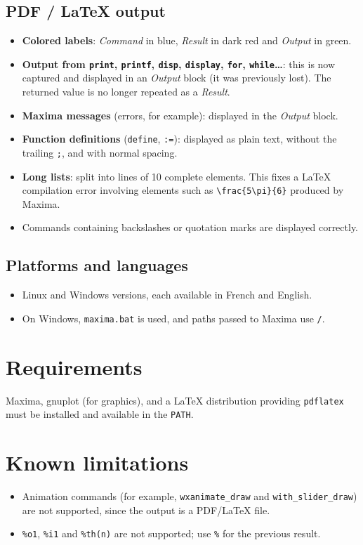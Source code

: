 \documentclass[a4paper,11pt]{article}
\begin{document}
\subsection*{PDF / \LaTeX{} output}
\begin{itemize}
\item \textbf{Colored labels}: \emph{Command} in blue, \emph{Result} in dark red and \emph{Output} in green.
\item \textbf{Output from \texttt{print}, \texttt{printf}, \texttt{disp}, \texttt{display}, \texttt{for}, \texttt{while}\ldots}: this is now captured and displayed in an \emph{Output} block (it was previously lost). The returned value is no longer repeated as a \emph{Result}.
\item \textbf{Maxima messages} (errors, for example): displayed in the \emph{Output} block.
\item \textbf{Function definitions} (\texttt{define}, \texttt{:=}): displayed as plain text, without the trailing \verb|;|, and with normal spacing.
\item \textbf{Long lists}: split into lines of 10 complete elements. This fixes a \LaTeX{} compilation error involving elements such as \verb|\frac{5\pi}{6}| produced by Maxima.
\item Commands containing backslashes or quotation marks are displayed correctly.
\end{itemize}

\subsection*{Platforms and languages}
\begin{itemize}
\item Linux and Windows versions, each available in French and English.
\item On Windows, \texttt{maxima.bat} is used, and paths passed to Maxima use \verb|/|.
\end{itemize}

\section*{Requirements}
Maxima, gnuplot (for graphics), and a \LaTeX{} distribution providing \texttt{pdflatex} must be installed and available in the \texttt{PATH}.

\section*{Known limitations}
\begin{itemize}
\item Animation commands (for example, \verb|wxanimate_draw| and \verb|with_slider_draw|) are not supported, since the output is a PDF/\LaTeX{} file.
\item \verb|%o1|, \verb|%i1| and \verb|%th(n)| are not supported; use \verb|%| for the previous result.
\end{itemize}
\end{document}
